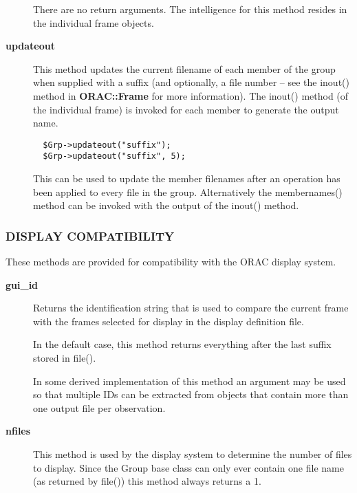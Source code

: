 \begin{description}
There are no return arguments. The intelligence for this method resides
in the individual frame objects.

\item[\textbf{updateout}] \mbox{}

This method updates the current filename of each member of the group
when supplied with a suffix (and optionally, a file number -- see the
inout() method in \textbf{ORAC::Frame} for more information). The inout() 
method (of the individual frame) is invoked for each member to 
generate the output name.

\begin{verbatim}
  $Grp->updateout("suffix");
  $Grp->updateout("suffix", 5);
\end{verbatim}


This can be used to update the member filenames after an operation
has been applied to every file in the group. Alternatively the 
membernames() method can be invoked with the output of the inout()
method.

\end{description}
\subsubsection*{DISPLAY COMPATIBILITY\label{ORAC::Group_DISPLAY_COMPATIBILITY}}

These methods are provided for compatibility with the ORAC display
system.

\begin{description}
\item[\textbf{gui\_id}] \mbox{}

Returns the identification string that is used to compare the
current frame with the frames selected for display in the
display definition file.



In the default case, this method returns everything after the
last suffix stored in file().



In some derived implementation of this method an argument
may be used so that multiple IDs can be extracted from objects
that contain more than one output file per observation.

\item[\textbf{nfiles}] \mbox{}

This method is used by the display system to determine the
number of files to display. Since the Group base class can only
ever contain one file name (as returned by file()) this method
always returns a 1.

\end{description}
